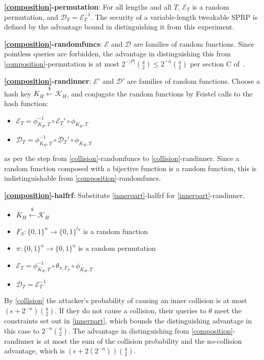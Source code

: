 \documentclass[journal=tosc,preprint,floatrow,submission]{iacrtrans}
\newcommand*{\xprm}[2]{\textsf{\ref*{#1}-#2}}
\newcommand*{\xprmtitle}[2]{\textbf{\xprm{#1}{#2}}}
\newcommand*{\calE}{\mathcal{E}}
\newcommand*{\calD}{\mathcal{D}}
\begin{document}
\xprmtitle{composition}{permutation}: For all lengths and all $T$, $\calE_T$ is a random permutation,
and $\calD_T = \calE_T^{-1}$. The security of a variable-length tweakable SPRP is defined by
the advantage bound in distinguishing it from this experiment.

\xprmtitle{composition}{randomfuncs}: $\calE$ and $\calD$ are
families of random functions.
Since pointless queries are forbidden, the advantage in distinguishing this from
\xprm{composition}{permutation} is at most $2^{-|P|}\binom{q}{2} \leq 2^{-n}\binom{q}{2}$
per section C of~\cite{cmc}.

\xprmtitle{composition}{randinner}: $\calE'$ and $\calD'$ are families of random functions.
Choose a hash key $K_H \xleftarrow{\$} \mathcal{K}_H$,
and conjugate the random functions by Feistel calls to the hash function:

\begin{itemize}
    \item $\calE_T = \phi^{-1}_{K_H, T} \circ \calE_T' \circ \phi_{K_H, T}$
    \item $\calD_T = \phi^{-1}_{K_H, T} \circ \calD_T' \circ \phi_{K_H, T}$
\end{itemize}

as per the step from \xprm{collision}{randomfuncs}
to \xprm{collision}{randinner}.
Since a random function composed with a bijective function is a random function,
this is indistinguishable from \xprm{composition}{randomfuncs}.

\xprmtitle{composition}{halfrf}: Substitute \xprm{innerpart}{halfrf} for \xprm{innerpart}{randinner}.
\begin{itemize}
    \item $K_H \xleftarrow{\$} \mathcal{K}_H$
    \item $F_S: \{0,1\}^n \rightarrow \{0,1\}^{l_S}$ is a random function
    \item $\pi: \{0,1\}^n \rightarrow \{0,1\}^n$ is a random permutation
    \item $\calE_T = \phi^{-1}_{K_H, T} \circ \theta_{\pi, F_S} \circ \phi_{K_H, T}$
    \item $\calD_T = \calE_T^{-1}$
\end{itemize}

By \autoref{collision} the attacker's probability of causing an inner collision is at most
$(\epsilon + 2^{-n})\binom{q}{2}$. If they do not cause a collision,
their queries to $\theta$ meet the constraints set out in \autoref{innerpart}, which
bounds the distinguishing advantage in this case to $2^{-n}\binom{q}{2}$.
The advantage in distinguishing from \xprm{composition}{randinner}
is at most the sum of the collision probability and the no-collision advantage, which is
$(\epsilon + 2(2^{-n}))\binom{q}{2}$.
\end{document}
